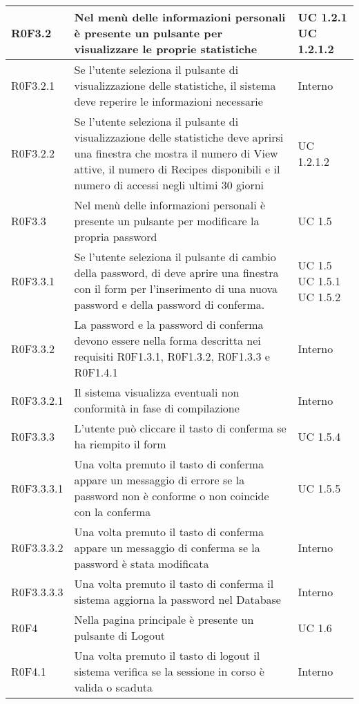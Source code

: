 \begin{center}
\begin{longtable}{| p{2cm} | p{8cm} | p{2cm} |}
		\hline
		R0F3.2  &  Nel menù delle informazioni personali è presente un pulsante per visualizzare le proprie statistiche &  UC 1.2.1 \newline UC 1.2.1.2 \\
		\hline
		R0F3.2.1  &  Se l'utente seleziona il pulsante di visualizzazione delle statistiche, il sistema deve reperire le informazioni necessarie  &  Interno \\
		\hline
		R0F3.2.2  &  Se l'utente seleziona il pulsante di visualizzazione delle statistiche deve aprirsi una finestra che mostra il numero di View attive, il numero di Recipes disponibili e il numero di accessi negli ultimi 30 giorni &  UC 1.2.1.2 \\
		\hline
		R0F3.3  &  Nel menù delle informazioni personali è presente un pulsante per modificare la propria password &  UC 1.5 \\
		\hline
		R0F3.3.1  &  Se l'utente seleziona il pulsante di cambio della password, di deve aprire una finestra con il form per l'inserimento di una nuova password e della password di conferma. &  UC 1.5 \newline UC 1.5.1 \newline UC 1.5.2 \\
		\hline
		R0F3.3.2  &  La password e la password di conferma devono essere nella forma descritta nei requisiti R0F1.3.1, R0F1.3.2, R0F1.3.3 e R0F1.4.1  &  Interno \\
		\hline
		R0F3.3.2.1  &  Il sistema visualizza eventuali non conformità in fase di compilazione  &  Interno \\
		\hline
		R0F3.3.3  &  L'utente può cliccare il tasto di conferma se ha riempito il form  &  UC 1.5.4 \\
		\hline
		R0F3.3.3.1  &  Una volta premuto il tasto di conferma appare un messaggio di errore se la password non è conforme o non coincide con la conferma  &  UC 1.5.5 \\
		\hline
		R0F3.3.3.2  &  Una volta premuto il tasto di conferma appare un messaggio di conferma se la password è stata modificata  &  Interno \\
		\hline
		R0F3.3.3.3  &  Una volta premuto il tasto di conferma il sistema aggiorna la password nel Database  &  Interno \\
		\hline
		R0F4  &  Nella pagina principale è presente un pulsante di Logout  &  UC 1.6 \\
		\hline
		R0F4.1  &  Una volta premuto il tasto di logout il sistema verifica se la sessione in corso è valida o scaduta  &  Interno \\

\end{longtable}
\end{center}

